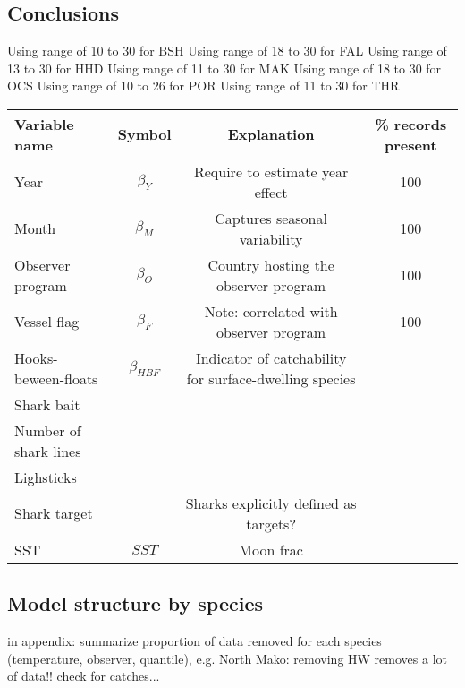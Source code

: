 \documentclass{SCreport}
\begin{document}
\subsection{Conclusions}            


      
\clearpage     
      
Using range of 10 to 30 for BSH
Using range of 18 to 30 for FAL
Using range of 13 to 30 for HHD
Using range of 11 to 30 for MAK
Using range of 18 to 30 for OCS
Using range of 10 to 26 for POR
Using range of 11 to 30 for THR      
      



\begin{table}[!h]
\label{tbl:glm-vars}
\begin{center}
\begin{tabular}{l|c|c|c}
Variable name & Symbol & Explanation & \% records present\\
\hline
\hline
Year & $\beta_Y$ & Require to estimate year effect & 100\\
Month & $\beta_M$ & Captures seasonal variability & 100\\
Observer program & $\beta_O$ & Country hosting the observer program & 100\\
Vessel flag & $\beta_F$ & Note: correlated with observer program & 100\\
Hooks-beween-floats& $\beta_{HBF}$ & Indicator of catchability for surface-dwelling species\\
Shark bait \\
Number of shark lines\\
Lighsticks \\
Shark target&&Sharks explicitly defined as targets?\\
SST & $SST$ & 
Moon frac & \\

\end{tabular}
\end{center}
\end{table}



\subsection{Model structure by species}
in appendix: summarize proportion of data removed for each species (temperature, observer, quantile), e.g. North Mako: removing HW removes a lot of data!! check for catches...
\end{document}
